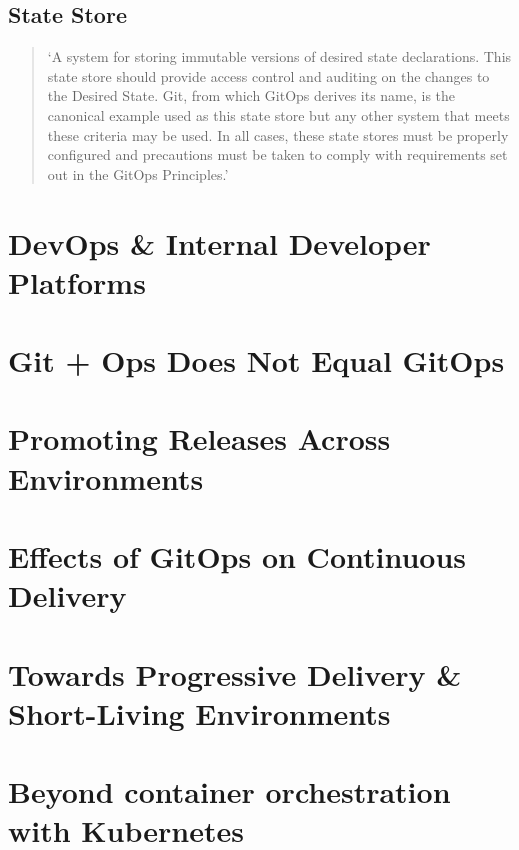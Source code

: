 \subsection*{State Store}
\begin{quotation}
\noindent
\enquote*{A system for storing immutable versions of desired state declarations. This state store should provide access control and auditing on the changes to the Desired State. Git, from which GitOps derives its name, is the canonical example used as this state store but any other system that meets these criteria may be used. In all cases, these state stores must be properly configured and precautions must be taken to comply with requirements set out in the GitOps Principles.}
\autocite{gitopsGlossary}
\end{quotation}













\section{DevOps \& Internal Developer Platforms}








\section{Git + Ops Does Not Equal GitOps}

\section{Promoting Releases Across Environments}

\section{Effects of GitOps on Continuous Delivery}

\section{Towards Progressive Delivery \& Short-Living Environments}

\section{Beyond container orchestration with Kubernetes}

